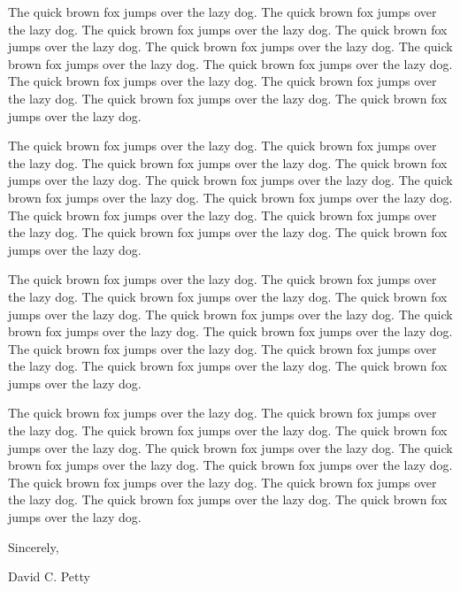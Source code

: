 \documentclass[11pt]{article}%
\numberwithin{equation}{section}%
\begin{document}
\begin{multicols}{2}
The quick brown fox jumps over the lazy dog. The quick brown fox
jumps over the lazy dog. The quick brown fox jumps over the lazy
dog. The quick brown fox jumps over the lazy dog. The quick brown
fox jumps over the lazy dog. The quick brown fox jumps over the lazy
dog. The quick brown fox jumps over the lazy dog. The quick brown
fox jumps over the lazy dog. The quick brown fox jumps over the lazy
dog. The quick brown fox jumps over the lazy dog. The quick brown
fox jumps over the lazy dog.


The quick brown fox jumps over the lazy dog. The quick brown fox
jumps over the lazy dog. The quick brown fox jumps over the lazy
dog. The quick brown fox jumps over the lazy dog. The quick brown
fox jumps over the lazy dog. The quick brown fox jumps over the lazy
dog. The quick brown fox jumps over the lazy dog. The quick brown
fox jumps over the lazy dog. The quick brown fox jumps over the lazy
dog. The quick brown fox jumps over the lazy dog. The quick brown
fox jumps over the lazy dog.


The quick brown fox jumps over the lazy dog. The quick brown fox
jumps over the lazy dog. The quick brown fox jumps over the lazy
dog. The quick brown fox jumps over the lazy dog. The quick brown
fox jumps over the lazy dog. The quick brown fox jumps over the lazy
dog. The quick brown fox jumps over the lazy dog. The quick brown
fox jumps over the lazy dog. The quick brown fox jumps over the lazy
dog. The quick brown fox jumps over the lazy dog. The quick brown
fox jumps over the lazy dog.


The quick brown fox jumps over the lazy dog. The quick brown fox
jumps over the lazy dog. The quick brown fox jumps over the lazy
dog. The quick brown fox jumps over the lazy dog. The quick brown
fox jumps over the lazy dog. The quick brown fox jumps over the lazy
dog. The quick brown fox jumps over the lazy dog. The quick brown
fox jumps over the lazy dog. The quick brown fox jumps over the lazy
dog. The quick brown fox jumps over the lazy dog. The quick brown
fox jumps over the lazy dog.
\end{multicols}

Sincerely,

\vspace{1cm}

David C. Petty

\vspace{3ex}

\hbox{
%
%
}
\end{document}
